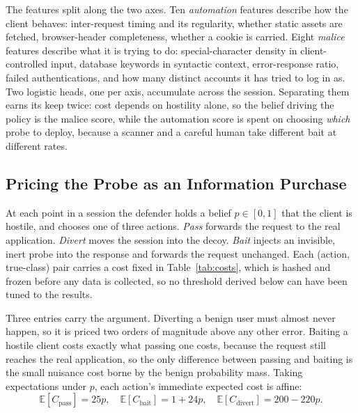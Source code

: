 \documentclass[runningheads]{llncs}
\begin{document}
The features split along the two axes. Ten \emph{automation} features describe how
the client behaves: inter-request timing and its regularity, whether static assets
are fetched, browser-header completeness, whether a cookie is carried. Eight
\emph{malice} features describe what it is trying to do: special-character density
in client-controlled input, database keywords in syntactic context, error-response
ratio, failed authentications, and how many distinct accounts it has tried to log in
as. Two logistic heads, one per axis, accumulate across the session. Separating them
earns its keep twice: cost depends on hostility alone, so the belief driving the
policy is the malice score, while the automation score is spent on choosing
\emph{which} probe to deploy, because a scanner and a careful human take different
bait at different rates.


\subsection{Pricing the Probe as an Information Purchase}
\label{sec:rule}

At each point in a session the defender holds a belief $p \in [0,1]$ that the
client is hostile, and chooses one of three actions. \emph{Pass} forwards the
request to the real application. \emph{Divert} moves the session into the decoy.
\emph{Bait} injects an invisible, inert probe into the response and forwards the
request unchanged. Each (action, true-class) pair carries a cost fixed in
Table~\ref{tab:costs}, which is hashed and frozen before any data is collected, so
no threshold derived below can have been tuned to the results.

Three entries carry the argument. Diverting a benign user must almost never happen,
so it is priced two orders of magnitude above any other error. Baiting a hostile
client costs exactly what passing one costs, because the request still reaches the
real application, so the only difference between passing and baiting is the small
nuisance cost borne by the benign probability mass. Taking expectations under $p$,
each action's immediate expected cost is affine:
%
\begin{equation}
\mathbb{E}[C_{\text{pass}}] = 25p, \quad
\mathbb{E}[C_{\text{bait}}] = 1 + 24p, \quad
\mathbb{E}[C_{\text{divert}}] = 200 - 220p .
\end{equation}
\end{document}
